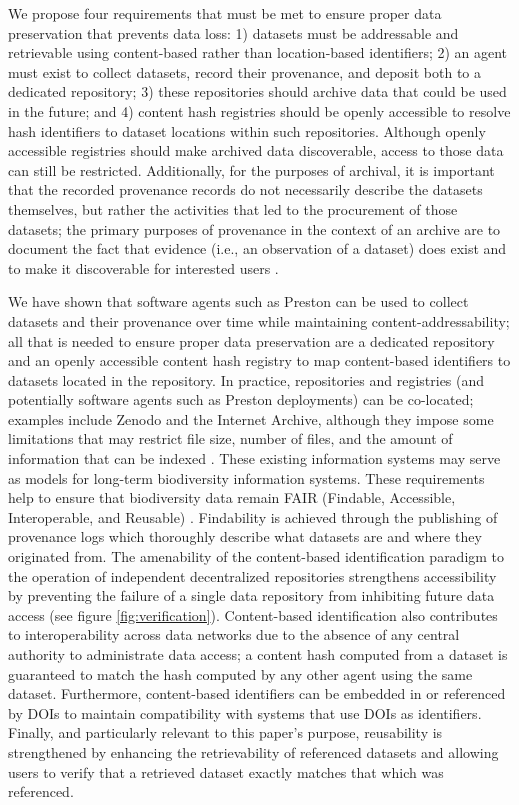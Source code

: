 We propose four requirements that must be met to ensure proper data preservation that prevents data loss: 1) datasets must be addressable and retrievable using content-based rather than location-based identifiers; 2) an agent must exist to collect datasets, record their provenance, and deposit both to a dedicated repository; 3) these repositories should archive data that could be used in the future; and 4) content hash registries should be openly accessible to resolve hash identifiers to dataset locations within such repositories. Although openly accessible registries should make archived data discoverable, access to those data can still be restricted. Additionally, for the purposes of archival, it is important that the recorded provenance records do not necessarily describe the datasets themselves, but rather the activities that led to the procurement of those datasets; the primary purposes of provenance in the context of an archive are to document the fact that evidence (i.e., an observation of a dataset) does exist and to make it discoverable for interested users \citep{Bearman_1995}.

We have shown that software agents such as Preston can be used to collect datasets and their provenance over time while maintaining content-addressability; all that is needed to ensure proper data preservation are a dedicated repository and an openly accessible content hash registry to map content-based identifiers to datasets located in the repository. In practice, repositories and registries (and potentially software agents such as Preston deployments) can be co-located; examples include Zenodo and the Internet Archive, although they impose some limitations that may restrict file size, number of files, and the amount of information that can be indexed \citep{zenodo_2019,archive_2019}. These existing information systems may serve as models for long-term biodiversity information systems. These requirements help to ensure that biodiversity data remain FAIR (Findable, Accessible, Interoperable, and Reusable) \citep{Wilkinson_2016}. Findability is achieved through the publishing of provenance logs which thoroughly describe what datasets are and where they originated from. The amenability of the content-based identification paradigm to the operation of independent decentralized repositories strengthens accessibility by preventing the failure of a single data repository from inhibiting future data access (see figure \ref{fig:verification}). Content-based identification also contributes to interoperability across data networks due to the absence of any central authority to administrate data access; a content hash computed from a dataset is guaranteed to match the hash computed by any other agent using the same dataset. Furthermore, content-based identifiers can be embedded in or referenced by DOIs to maintain compatibility with systems that use DOIs as identifiers. Finally, and particularly relevant to this paper's purpose, reusability is strengthened by enhancing the retrievability of referenced datasets and allowing users to verify that a retrieved dataset exactly matches that which was referenced.



